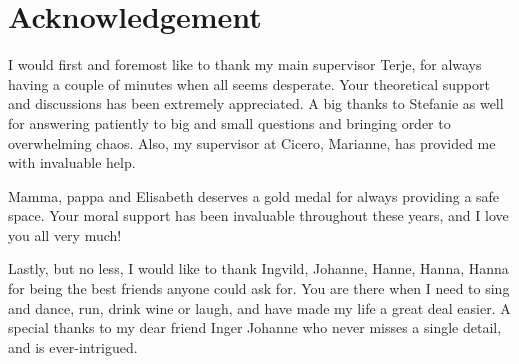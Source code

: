 \chapter*{Acknowledgement}
I would first and foremost like to thank my main supervisor Terje, for always having a couple of minutes when all seems desperate. Your theoretical support and discussions has been extremely appreciated. A big thanks to Stefanie as well for answering patiently to big and small questions and bringing order to overwhelming chaos. Also, my supervisor at Cicero, Marianne, has provided me with invaluable help.  

\medskip

Mamma, pappa and Elisabeth deserves a gold medal for always providing a safe space. Your moral support has been invaluable throughout these years, and I love you all very much!

\medskip

Lastly, but no less, I would like to thank Ingvild, Johanne, Hanne, Hanna, Hanna for being the best friends anyone could ask for. You are there when I need to sing and dance, run, drink wine or laugh, and have made my life a great deal easier. A special thanks to my dear friend Inger Johanne who never misses a single detail, and is ever-intrigued. %

\cleardoublepage